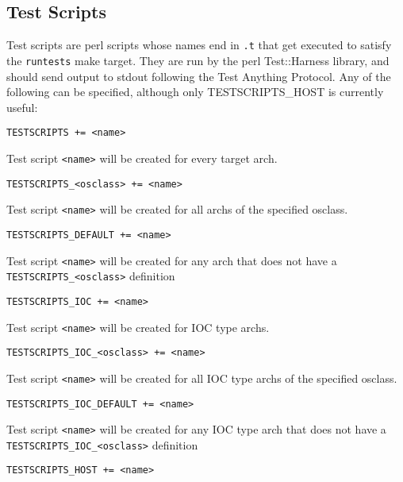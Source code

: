 \subsection{Test Scripts}

Test scripts are perl scripts whose names end in \verb|.t| that get executed to satisfy the \verb|runtests| make target. They are run 
by the perl Test::Harness library, and should send output to stdout following the Test Anything Protocol. Any of the 
following can be specified, although only TESTSCRIPTS\_HOST is currently useful:

\begin{description}

\item {}\verb|TESTSCRIPTS += <name>|

Test script \verb|<name>| will be created for every target arch.

\item \verb|TESTSCRIPTS_<osclass> += <name>|

Test script \verb|<name>| will be created for all archs of the specified osclass.

\item \verb|TESTSCRIPTS_DEFAULT += <name>|

Test script \verb|<name>| will be created for any arch that does not have a \\
\verb|TESTSCRIPTS_<osclass>| definition

\item 

\item {}\verb|TESTSCRIPTS_IOC += <name>|

Test script \verb|<name>| will be created for IOC type archs.

\item \verb|TESTSCRIPTS_IOC_<osclass> += <name>|

Test script \verb|<name>| will be created for all IOC type archs of the specified osclass.

\item \verb|TESTSCRIPTS_IOC_DEFAULT += <name>|

Test script \verb|<name>| will be created for any IOC type arch that does not have a \\
\verb|TESTSCRIPTS_IOC_<osclass>| definition

\item

\item {}\verb|TESTSCRIPTS_HOST += <name>|


\end{description}
